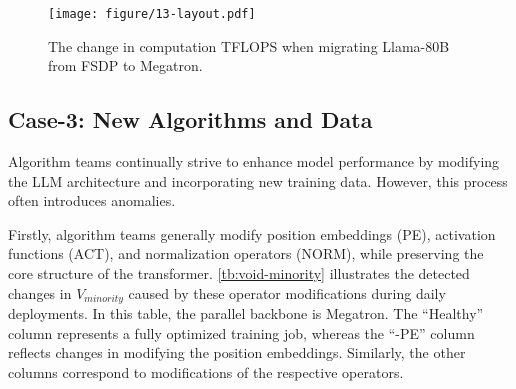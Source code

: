 


\begin{figure}
    \centering
    \texttt{[image: figure/13-layout.pdf]}
    \vspace{-2mm}
    \caption{The change in computation TFLOPS when migrating Llama-80B from FSDP to Megatron.}
    \label{fig:layout}
    \vspace{-4mm}
\end{figure}
\subsection{Case-3: New Algorithms and Data}
Algorithm teams continually strive to enhance model performance by modifying the LLM architecture and incorporating new training data. However, this process often introduces anomalies.

Firstly, algorithm teams generally modify position embeddings (PE), activation functions (ACT), and normalization operators (NORM), while preserving the core structure of the transformer. \autoref{tb:void-minority} illustrates the detected changes in $V_{minority}$ caused by these operator modifications during daily deployments. In this table, the parallel backbone is Megatron. The “Healthy” column represents a fully optimized training job, whereas the “-PE” column reflects changes in modifying the position embeddings. Similarly, the other columns correspond to modifications of the respective operators.

